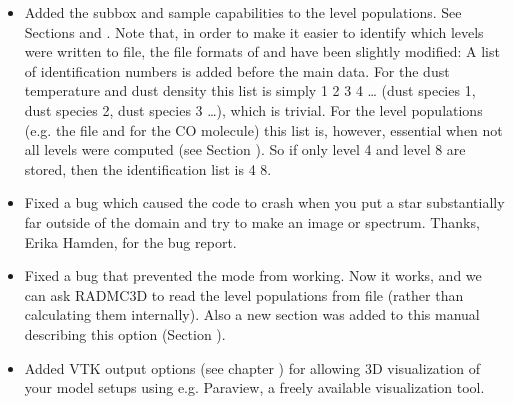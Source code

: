 \documentclass[letterpaper,10pt,english]{sphinxmanual}
\begin{document}
\begin{itemize}
\begin{itemize}
\item {} 
Added the subbox and sample capabilities to the level populations.
See Sections {\hyperref[\detokenize{toolsinside:sec-subbox}]{}} and {\hyperref[\detokenize{toolsinside:sec-sampling}]{}}. Note that, in
order to make it easier to identify which levels were written to file,
the file formats of  and  have been
slightly modified: A list of identification
numbers is added before the main data. For the dust temperature and dust
density this list is simply 1 2 3 4 …  (dust species 1, dust species
2, dust species 3 …), which is trivial. For the level populations
(e.g. the file  and 
for the CO molecule) this list is, however,
essential when not all levels were computed (see Section
{\hyperref[\detokenize{lineradtrans:sec-calcstore-levpop}]{}}). So if only level 4 and level 8 are stored,
then the identification list is 4 8.

\item {} 
Fixed a bug which caused the code to crash when you put a star
substantially far outside of the domain and try to make an image or
spectrum. Thanks, Erika Hamden, for the bug report.

\item {} 
Fixed a bug that prevented the  mode from
working. Now it works, and we can ask RADMC\sphinxhyphen{}3D to read the level
populations from file (rather than calculating them internally).  Also a
new section was added to this manual describing this option (Section
{\hyperref[\detokenize{lineradtrans:sec-nonlte-read-levelpop}]{}}).

\item {} 
Added VTK output options (see chapter {\hyperref[\detokenize{vtkoutput:chap-vtk-output}]{}}) for
allowing 3\sphinxhyphen{}D visualization of your model setups using e.g. Paraview, a
freely available visualization tool.


\end{itemize}
\end{itemize}
\end{document}
